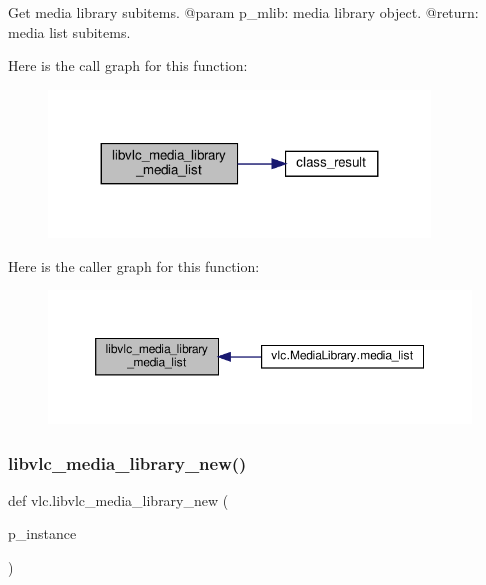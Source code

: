 \begin{DoxyVerb}Get media library subitems.
@param p_mlib: media library object.
@return: media list subitems.
\end{DoxyVerb}
 Here is the call graph for this function\+:
\nopagebreak
\begin{figure}[H]
\begin{center}
\leavevmode
\includegraphics[width=287pt]{namespacevlc_a0df1f618236bf73ed4b0b4d17ca37a7c_cgraph}
\end{center}
\end{figure}
Here is the caller graph for this function\+:
\nopagebreak
\begin{figure}[H]
\begin{center}
\leavevmode
\includegraphics[width=350pt]{namespacevlc_a0df1f618236bf73ed4b0b4d17ca37a7c_icgraph}
\end{center}
\end{figure}
\mbox{\label{namespacevlc_a4f0c42c16464e769b411cbcf38091eeb}} 
\subsubsection{\texorpdfstring{libvlc\+\_\+media\+\_\+library\+\_\+new()}{libvlc\_media\_library\_new()}}
{\footnotesize\ttfamily def vlc.\+libvlc\+\_\+media\+\_\+library\+\_\+new (\begin{DoxyParamCaption}\item[{}]{p\+\_\+instance }\end{DoxyParamCaption})}


